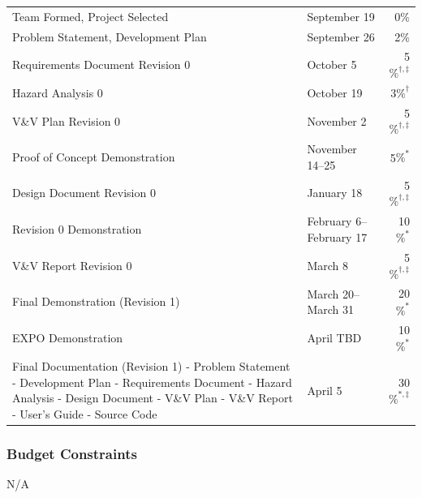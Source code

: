 \documentclass[12pt]{article}
\begin{document}
\begin{tabular}{ p{9.7cm} l r}
	
	Team Formed, Project Selected & September 19 & 0\% \\
	
	Problem Statement, Development Plan & September 26 &
	2\% \\
	
	Requirements Document Revision 0 & October 5 & 5$\%^{\dagger, \ddagger}$ \\
	
	Hazard Analysis 0 & October 19 & 3$\%^\dagger$ \\
	
	V\&V Plan Revision 0 & November 2 & 5$\%^{\dagger, \ddagger}$ \\
	
	Proof of Concept Demonstration & November 14--25 & 5$\%^*$ \\
	
	Design Document Revision 0 & January 18 & 5$\%^{\dagger, \ddagger}$ \\
	
	Revision 0 Demonstration & February 6--February 17 & 10$\%^*$\\
	
	V\&V Report Revision 0 & March 8 & 5$\%^{\dagger, \ddagger}$ \\
	
	Final Demonstration (Revision 1) & March 20--March 31 &  20$\%^*$ \\
	
	EXPO Demonstration & April TBD & 10$\%^*$ \\
	
	Final Documentation (Revision 1)\newline 
	- Problem Statement\newline
	- Development Plan\newline
	- Requirements Document\newline
	- Hazard Analysis\newline
	- Design Document\newline
	- V\&V Plan\newline
	- V\&V Report\newline
	- User's Guide\newline
	- Source Code\newline &  April 5 & 30$\%^{*, \ddagger}$\\
	
\end{tabular}
\subsubsection{Budget Constraints}
N/A
\end{document}

